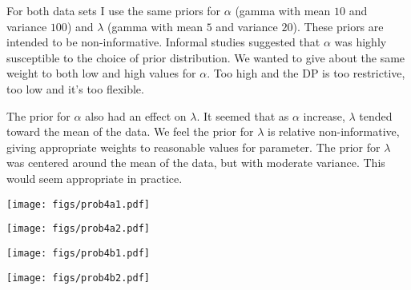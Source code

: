 \documentclass[12pt]{article}
\begin{document}
\noindent For both data sets I use the same priors for $\alpha$ (gamma with mean $10$ and variance $100$) and $\lambda$ (gamma with mean $5$ and variance $20$). These priors are intended to be non-informative. Informal studies suggested that $\alpha$ was highly susceptible to the choice of prior distribution. We wanted to give about the same weight to both low and high values for $\alpha$. Too high and the DP is too restrictive, too low and it's too flexible.
\bigskip

\noindent The prior for $\alpha$ also had an effect on $\lambda$. It seemed that as $\alpha$ increase, $\lambda$ tended toward the mean of the data. We feel the prior for $\lambda$ is relative non-informative, giving appropriate weights to reasonable values for parameter. The prior for $\lambda$ was centered around the mean of the data, but with moderate variance. This would seem appropriate in practice.
\bigskip

\newpage

\begin{center}
\texttt{[image: figs/prob4a1.pdf]}
\end{center}

\begin{center}
\texttt{[image: figs/prob4a2.pdf]}
\end{center}

\newpage

\begin{center}
\texttt{[image: figs/prob4b1.pdf]}
\end{center}

\begin{center}
\texttt{[image: figs/prob4b2.pdf]}
\end{center}
\end{document}
